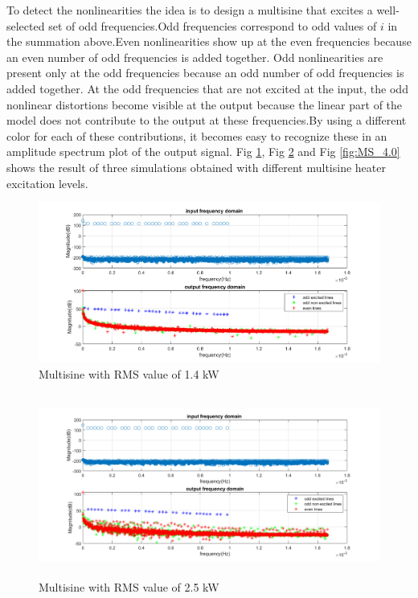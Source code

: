 \documentclass[a4paper,12pt]{report}
\numberwithin{equation}{section}
\begin{document}
To detect the nonlinearities the idea is to design a multisine  that excites a well-selected set of odd frequencies.Odd frequencies correspond  to odd values of $i$ in the summation above.Even nonlinearities show up at the even frequencies because an even number of odd frequencies is added together. Odd nonlinearities are present only at the odd frequencies because an odd number of odd frequencies is added together. At the odd frequencies that are not excited at the input, the odd nonlinear distortions become visible at the output because the linear part of the model does not contribute to the output at these frequencies.By using a different color for each of these
contributions, it becomes easy to recognize these in an amplitude spectrum plot of the output signal. Fig \ref{fig:MS_1.4},  Fig \ref{fig:MS_2.5} and  Fig \ref{fig:MS_4.0} shows the result of three simulations obtained with different multisine heater  excitation levels.

\begin{figure}[H]
    \includegraphics[width=\textwidth]{MS_1.4kw.png}
    \centering
    \caption{Multisine with RMS value of 1.4 kW}
    \label{fig:MS_1.4}
\end{figure}

\begin{figure}[H]
    \includegraphics[width=\textwidth, height=6cm]{MS_2.5kw.png}
    \centering
    \caption{Multisine with RMS value of 2.5 kW}
    \label{fig:MS_2.5}
\end{figure}
\end{document}
